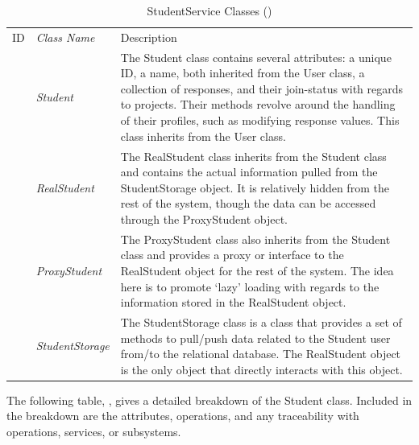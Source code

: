 \documentclass[12pt,letterpaper]{article}
\begin{document}
\begin{table}[H]
	\caption{StudentService Classes ()} 
	\begin{tabu} to 
	    \tableheader{}ID & Class Name & Description \\
		 & Student & The Student class contains several attributes: a unique ID, a name, both inherited from the User class, a collection of responses, and their join-status with regards to projects. Their methods revolve around the handling of their profiles, such as modifying response values. This class inherits from the User class. \\
		 & RealStudent & The RealStudent class inherits from the Student class and contains the actual information pulled from the StudentStorage object. It is relatively hidden from the rest of the system, though the data can be accessed through the ProxyStudent object.\\
		 & ProxyStudent & The ProxyStudent class also inherits from the Student class and provides a proxy or interface to the RealStudent object for the rest of the system. The idea here is to promote `lazy' loading with regards to the information stored in the RealStudent object.\\
		 & StudentStorage & The StudentStorage class is a class that provides a set of methods to pull/push data related to the Student user from/to the relational database. The RealStudent object is the only object that directly interacts with this object.\\
	\end{tabu}
\end{table}

\newpage{}
The following table, , gives a detailed breakdown of the Student class. Included in the breakdown are the attributes, operations, and any traceability with operations, services, or subsystems.
\end{document}
